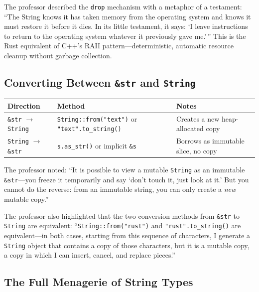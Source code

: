 \begin{insightbox}
The professor described the \texttt{drop} mechanism with a metaphor of a testament: ``The String knows it has taken memory from the operating system and knows it must restore it before it dies. In its little testament, it says: `I leave instructions to return to the operating system whatever it previously gave me.'\,'' This is the Rust equivalent of C++'s RAII pattern---deterministic, automatic resource cleanup without garbage collection.
\end{insightbox}

\subsection{Converting Between \texttt{\&str} and \texttt{String}}

\begin{center}
\begin{tabular}{|l|l|l|}
\hline
\textbf{Direction} & \textbf{Method} & \textbf{Notes} \\
\hline
\texttt{\&str} $\to$ \texttt{String} & \texttt{String::from("text")} or \texttt{"text".to\_string()} & Creates a new heap-allocated copy \\
\hline
\texttt{String} $\to$ \texttt{\&str} & \texttt{s.as\_str()} or implicit \texttt{\&s} & Borrows as immutable slice, no copy \\
\hline
\end{tabular}
\end{center}

The professor noted: ``It is possible to view a mutable \texttt{String} as an immutable \texttt{\&str}---you freeze it temporarily and say `don't touch it, just look at it.' But you cannot do the reverse: from an immutable string, you can only create a \emph{new} mutable copy.''

The professor also highlighted that the two conversion methods from \texttt{\&str} to \texttt{String} are equivalent: ``\texttt{String::from("rust")} and \texttt{"rust".to\_string()} are equivalent---in both cases, starting from this sequence of characters, I generate a \texttt{String} object that contains a copy of those characters, but it is a mutable copy, a copy in which I can insert, cancel, and replace pieces.''

\subsection{The Full Menagerie of String Types}


